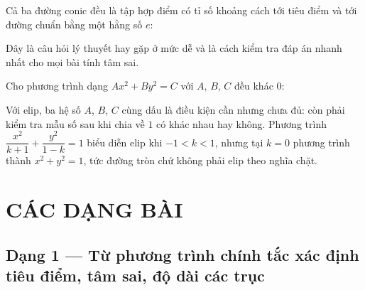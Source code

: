 \documentclass[11pt, a4paper]{article}
\begin{document}
\begin{dinhly}
Cả ba đường conic đều là tập hợp điểm có tỉ số khoảng cách tới tiêu điểm và tới đường chuẩn bằng một hằng số $e$:


 Đây là câu hỏi lý thuyết hay gặp ở mức dễ và là cách kiểm tra đáp án nhanh nhất cho mọi bài tính tâm sai.
\end{dinhly}
\begin{dinhly}
Cho phương trình dạng $Ax^2 + By^2 = C$ với $A$, $B$, $C$ đều khác $0$:


 Với elip, ba hệ số $A$, $B$, $C$ cùng dấu là điều kiện cần nhưng chưa đủ: còn phải kiểm tra mẫu số sau khi chia về $1$ có khác nhau hay không. Phương trình $\dfrac{x^2}{k+1} + \dfrac{y^2}{1-k} = 1$ biểu diễn elip khi $-1 < k < 1$, nhưng tại $k = 0$ phương trình thành $x^2 + y^2 = 1$, tức đường tròn chứ không phải elip theo nghĩa chặt.

\end{dinhly}
\section{CÁC DẠNG BÀI}

\subsection{Dạng 1 — Từ phương trình chính tắc xác định tiêu điểm, tâm sai, độ dài các trục}
\end{document}
